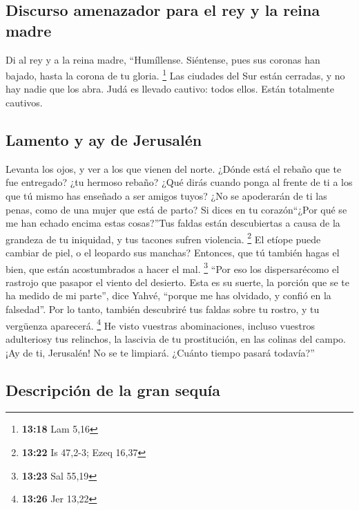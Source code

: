 \hypertarget{discurso-amenazador-para-el-rey-y-la-reina-madre}{%
\subsection{Discurso amenazador para el rey y la reina
madre}\label{discurso-amenazador-para-el-rey-y-la-reina-madre}}

 Di al rey y a la reina madre, ``Humíllense. Siéntense,
pues sus coronas han bajado, hasta la corona de tu gloria. \footnote{\textbf{13:18}
  Lam 5,16}  Las ciudades del Sur están cerradas, y no
hay nadie que los abra. Judá es llevado cautivo: todos ellos. Están
totalmente cautivos.

\hypertarget{lamento-y-ay-de-jerusaluxe9n}{%
\subsection{Lamento y ay de
Jerusalén}\label{lamento-y-ay-de-jerusaluxe9n}}

 Levanta los ojos, y ver a los que vienen del norte.
¿Dónde está el rebaño que te fue entregado? ¿tu hermoso rebaño?
 ¿Qué dirás cuando ponga al frente de ti a los que tú
mismo has enseñado a ser amigos tuyos? ¿No se apoderarán de ti las
penas, como de una mujer que está de parto?  Si dices en
tu corazón``¿Por qué se me han echado encima estas cosas?''Tus faldas
están descubiertas a causa de la grandeza de tu iniquidad, y tus tacones
sufren violencia. \footnote{\textbf{13:22} Is 47,2-3; Ezeq 16,37}
 El etíope puede cambiar de piel, o el leopardo sus
manchas? Entonces, que tú también hagas el bien, que están acostumbrados
a hacer el mal. \footnote{\textbf{13:23} Sal 55,19} 
``Por eso los dispersarécomo el rastrojo que pasapor el viento del
desierto.  Esta es su suerte, la porción que se te ha
medido de mi parte'', dice Yahvé, ``porque me has olvidado, y confió en
la falsedad''.  Por lo tanto, también descubriré tus
faldas sobre tu rostro, y tu vergüenza aparecerá. \footnote{\textbf{13:26}
  Jer 13,22}  He visto vuestras abominaciones, incluso
vuestros adulteriosy tus relinchos, la lascivia de tu prostitución, en
las colinas del campo. ¡Ay de ti, Jerusalén! No se te limpiará. ¿Cuánto
tiempo pasará todavía?''

\hypertarget{descripciuxf3n-de-la-gran-sequuxeda}{%
\subsection{Descripción de la gran
sequía}\label{descripciuxf3n-de-la-gran-sequuxeda}}

